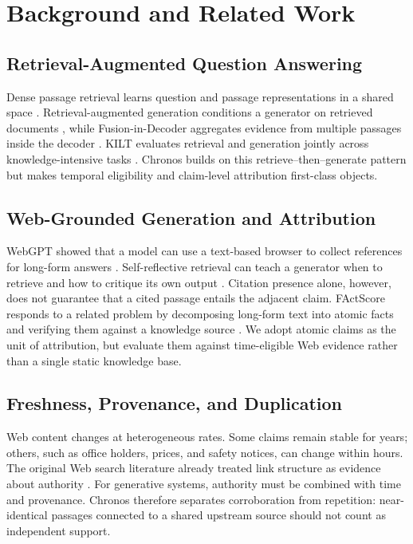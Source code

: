 \section{Background and Related Work}
\label{sec:related}

\subsection{Retrieval-Augmented Question Answering}

Dense passage retrieval learns question and passage representations in a shared
space \cite{karpukhin2020dpr}.  Retrieval-augmented generation conditions a
generator on retrieved documents \cite{lewis2020rag}, while Fusion-in-Decoder
aggregates evidence from multiple passages inside the decoder
\cite{izacard2021fid}.  KILT evaluates retrieval and generation jointly across
knowledge-intensive tasks \cite{petroni2021kilt}.  Chronos builds on this
retrieve--then--generate pattern but makes temporal eligibility and claim-level
attribution first-class objects.

\subsection{Web-Grounded Generation and Attribution}

WebGPT showed that a model can use a text-based browser to collect references
for long-form answers \cite{nakano2021webgpt}.  Self-reflective retrieval can
teach a generator when to retrieve and how to critique its own output
\cite{asai2024selfrag}.  Citation presence alone, however, does not guarantee
that a cited passage entails the adjacent claim.  FActScore responds to a
related problem by decomposing long-form text into atomic facts and verifying
them against a knowledge source \cite{min2023factscore}.  We adopt atomic claims
as the unit of attribution, but evaluate them against time-eligible Web
evidence rather than a single static knowledge base.

\subsection{Freshness, Provenance, and Duplication}

Web content changes at heterogeneous rates.  Some claims remain stable for
years; others, such as office holders, prices, and safety notices, can change
within hours.  The original Web search literature already treated link
structure as evidence about authority \cite{brin1998anatomy}.  For generative
systems, authority must be combined with time and provenance.  Chronos therefore
separates corroboration from repetition: near-identical passages connected to a
shared upstream source should not count as independent support.
